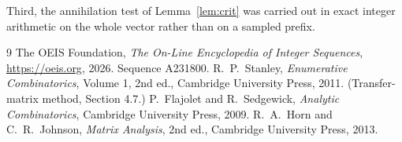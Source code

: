 \documentclass[11pt,a4paper]{article}
\theoremstyle{plain}
\theoremstyle{definition}
\begin{document}
Third, the annihilation test of Lemma~\ref{lem:crit} was carried out in exact integer
arithmetic on the whole vector rather than on a sampled prefix.

\begin{thebibliography}{9}
 The OEIS Foundation, \emph{The On-Line Encyclopedia of Integer
Sequences}, \url{https://oeis.org}, 2026. Sequence A231800.
 R.~P.~Stanley, \emph{Enumerative Combinatorics}, Volume 1, 2nd ed.,
Cambridge University Press, 2011. (Transfer-matrix method, Section 4.7.)
 P.~Flajolet and R.~Sedgewick, \emph{Analytic Combinatorics}, Cambridge
University Press, 2009.
 R.~A.~Horn and C.~R.~Johnson, \emph{Matrix Analysis}, 2nd ed., Cambridge
University Press, 2013.
\end{thebibliography}
\end{document}
